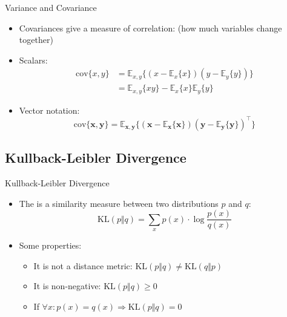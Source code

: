 \begin{frame}{Variance and Covariance}{}
	\begin{itemize}
		\item Covariances give a measure of correlation: {\footnotesize (how much variables change together)}
		\item Scalars:
		\begin{align}
			\nonumber
			\text{cov}\{ x, y \}
				&= \mathbb{E}_{x, y} \{ (x - \mathbb{E}_x\{ x \}) (y - \mathbb{E}_y\{ y \}) \} \\
				&= \mathbb{E}_{x, y}\{ xy \} - \mathbb{E}_x\{ x \} \mathbb{E}_y\{ y \}
		\end{align}
		\item Vector notation:
		\begin{equation}
			\text{cov}\{ \bm{x}, \bm{y} \} = \mathbb{E}_{\bm{x}, \bm{y}}\{ (\bm{x} - \mathbb{E}_{\bm{x}}\{ \bm{x} \})
				(\bm{y} - \mathbb{E}_{\bm{y}}\{ \bm{y} \})^{\intercal} \}
		\end{equation}
	\end{itemize}
\end{frame}


\subsection{Kullback-Leibler Divergence}

\begin{frame}{Kullback-Leibler Divergence}{}
	\begin{itemize}
		\item The  is a similarity measure between two distributions $p$ and $q$:
		\begin{equation}
			\text{KL}(p \Vert q) = \sum_{x} p(x) \cdot \log \frac{p(x)}{q(x)}
		\end{equation}
		\item Some properties:
		\begin{itemize}
			\item It is not a distance metric: $\text{KL}(p \Vert q) \ne \text{KL}(q \Vert p)$
			\item It is non-negative: $\text{KL}(p \Vert q) \ge 0$
			\item If $\forall x: p(x) = q(x) \Rightarrow \text{KL}(p \Vert q) = 0$
		\end{itemize}
	\end{itemize}
\end{frame}


